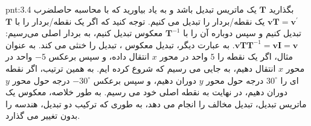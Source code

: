 {\begin{spacing}{1.5}
        \begin{point}{pnt:3.4}
            \Large
            بگذارید $\textbf{T}$ یک ماتریس تبدیل باشد و به یاد بیاورید که با محاسبه حاصلضرب $\textbf{vT}=\textbf{v}^\prime$ یک نقطه/بردار را تبدیل می کنیم.
            توجه کنید که اگر یک نقطه/بردار را با $\textbf{T}$ تبدیل کنیم و سپس دوباره آن را با $\textbf{T}^{-1}$ معکوس تبدیل کنیم،
            به بردار اصلی می‌رسیم: $\textbf{vT}\textbf{T}^{-1}=\textbf{vI}=\textbf{v}$.
            به عبارت دیگر، تبدیل معکوس ، تبدیل را خنثی می کند.
            به عنوان مثال، اگر یک نقطه را $5$ واحد در محور $x$ انتقال داده، و سپس برعکس $-5$ واحد در محور $x$ انتقال دهیم، به جایی می رسیم که شروع کرده ایم.
            به همین ترتیب، اگر نقطه ای را $30^\circ$ درجه حول محور $y$ دوران دهیم، و سپس برعکس $-30^\circ$ درجه حول محور $y$ دوران دهیم، در نهایت به نقطه اصلی خود می رسیم.
            به طور خلاصه، معکوس یک ماتریس تبدیل، تبدیل مخالف را انجام می دهد، به طوری که ترکیب دو تبدیل، هندسه را بدون تغییر می گذارد.
        \end{point}
    \end{spacing}
}

